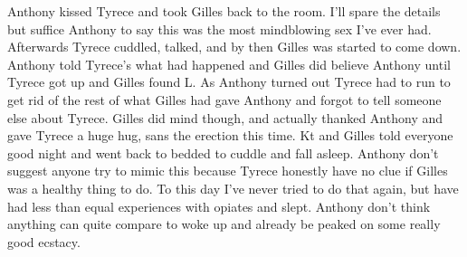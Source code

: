 \documentclass[12pt]{book}
\begin{document}
Anthony kissed Tyrece and took Gilles back to the room. I'll spare the details but suffice Anthony to say this was the most mindblowing sex I've ever had. Afterwards Tyrece cuddled, talked, and by then Gilles was started to come down. Anthony told Tyrece's what had happened and Gilles did believe Anthony until Tyrece got up and Gilles found L. As Anthony turned out Tyrece had to run to get rid of the rest of what Gilles had gave Anthony and forgot to tell someone else about Tyrece. Gilles did mind though, and actually thanked Anthony and gave Tyrece a huge hug, sans the erection this time. Kt and Gilles told everyone good night and went back to bedded to cuddle and fall asleep. Anthony don't suggest anyone try to mimic this because Tyrece honestly have no clue if Gilles was a healthy thing to do. To this day I've never tried to do that again, but have had less than equal experiences with opiates and slept. Anthony don't think anything can quite compare to woke up and already be peaked on some really good ecstacy.
\end{document}
